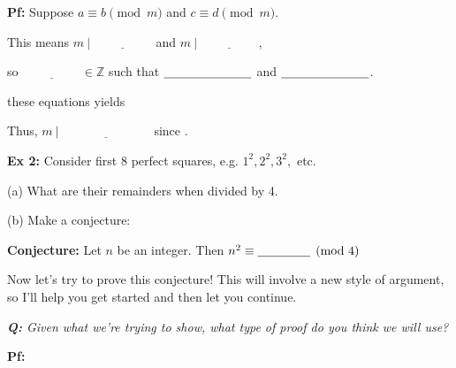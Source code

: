 \documentclass[fleqn]{article}
\theoremstyle{definition}
\begin{document}
	\vspace{8cm} 


\textbf{Pf:} Suppose $a \equiv b \pmod m$ and $c \equiv d \pmod m$. 

	\vspace{.75cm}
	This means $m \ | \ \underline{\hspace{2cm}}$ and $m \ | \ \underline{\hspace{2cm}}$, 

	\vspace{.25cm}
	so $\underline{\hspace{2cm}} \in \mathbb{Z}$ such that $\underline{\hspace{2.5cm}}$ and $\underline{\hspace{2.5cm}}$. 

	\vspace{.75cm}
	\underline{\hspace{3.5cm}} these equations yields

	\vspace{3cm}
	Thus, $m \ | \ \underline{\hspace{3cm}}$ since \underline{\hspace{2.5cm}}. 

	\vspace{1.5cm}



\newpage 


\textbf{Ex 2:} Consider first 8 perfect squares, e.g. $1^2, 2^2, 3^2,$ etc. 

\vspace{.25cm}
(a) What are their remainders when divided by 4. 

\vspace{2cm}
(b) Make a conjecture: 

\vspace{.25cm}
\hspace{1cm} \textbf{Conjecture:} Let $n$ be an integer. Then $n^2 \equiv \underline{\hspace{1.5cm}} \pmod 4$

\vspace{.25cm}
Now let's try to prove this conjecture! This will involve a new style of argument, so I'll help you get started and then let you continue. 

\vspace{.5cm}
{\it \textbf{Q:} Given what we're trying to show, what type of proof do you think we will use? }

	\vspace{1.5cm}
	\textbf{Pf:} 
\end{document}

